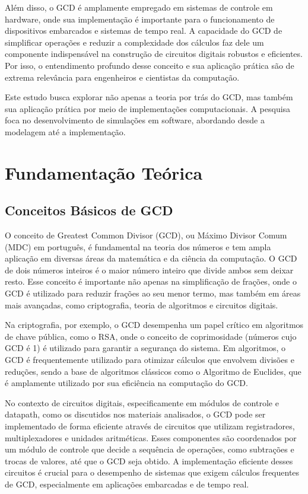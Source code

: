 \documentclass[a4paper,11pt]{article} %
\begin{document}
Além disso, o GCD é amplamente empregado em sistemas de controle em hardware, onde sua implementação é importante para o funcionamento de dispositivos embarcados e sistemas de tempo real. A capacidade do GCD de simplificar operações e reduzir a complexidade dos cálculos faz dele um componente indispensável na construção de circuitos digitais robustos e eficientes. Por isso, o entendimento profundo desse conceito e sua aplicação prática são de extrema relevância para engenheiros e cientistas da computação.

Este estudo busca explorar não apenas a teoria por trás do GCD, mas também sua aplicação prática por meio de implementações computacionais. A pesquisa foca no desenvolvimento de simulações em software, abordando desde a modelagem até a implementação.

\section{Fundamentação Teórica}

\subsection{Conceitos Básicos de GCD}
O conceito de Greatest Common Divisor (GCD), ou Máximo Divisor Comum (MDC) em português, é fundamental na teoria dos números e tem ampla aplicação em diversas áreas da matemática e da ciência da computação. O GCD de dois números inteiros é o maior número inteiro que divide ambos sem deixar resto. Esse conceito é importante não apenas na simplificação de frações, onde o GCD é utilizado para reduzir frações ao seu menor termo, mas também em áreas mais avançadas, como criptografia, teoria de algoritmos e circuitos digitais.

Na criptografia, por exemplo, o GCD desempenha um papel crítico em algoritmos de chave pública, como o RSA, onde o conceito de coprimosidade (números cujo GCD é 1) é utilizado para garantir a segurança do sistema. Em algoritmos, o GCD é frequentemente utilizado para otimizar cálculos que envolvem divisões e reduções, sendo a base de algoritmos clássicos como o Algoritmo de Euclides, que é amplamente utilizado por sua eficiência na computação do GCD.

No contexto de circuitos digitais, especificamente em módulos de controle e datapath, como os discutidos nos materiais analisados, o GCD pode ser implementado de forma eficiente através de circuitos que utilizam registradores, multiplexadores e unidades aritméticas. Esses componentes são coordenados por um módulo de controle que decide a sequência de operações, como subtrações e trocas de valores, até que o GCD seja obtido. A implementação eficiente desses circuitos é crucial para o desempenho de sistemas que exigem cálculos frequentes de GCD, especialmente em aplicações embarcadas e de tempo real.
\end{document}
